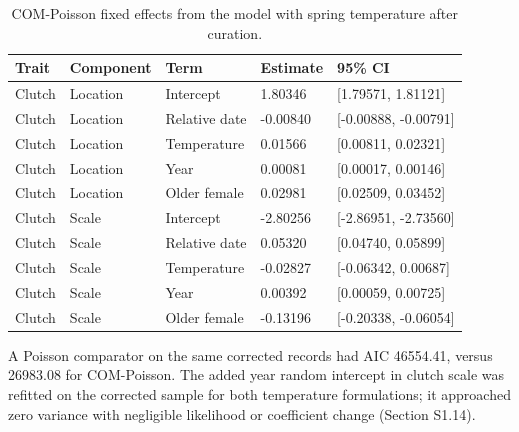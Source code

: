 \documentclass{article}
\begin{document}
\begin{table}[!ht]\centering\scriptsize\singlespacing
\caption{COM-Poisson fixed effects from the model with spring temperature after curation.}\label{tab:count-coefficients}
\begin{tabular}{lllll}\toprule
Trait & Component & Term & Estimate & 95\% CI\\\midrule
Clutch & Location & Intercept & 1.80346 & [1.79571, 1.81121]\\
Clutch & Location & Relative date & -0.00840 & [-0.00888, -0.00791]\\
Clutch & Location & Temperature & 0.01566 & [0.00811, 0.02321]\\
Clutch & Location & Year & 0.00081 & [0.00017, 0.00146]\\
Clutch & Location & Older female & 0.02981 & [0.02509, 0.03452]\\
Clutch & Scale & Intercept & -2.80256 & [-2.86951, -2.73560]\\
Clutch & Scale & Relative date & 0.05320 & [0.04740, 0.05899]\\
Clutch & Scale & Temperature & -0.02827 & [-0.06342, 0.00687]\\
Clutch & Scale & Year & 0.00392 & [0.00059, 0.00725]\\
Clutch & Scale & Older female & -0.13196 & [-0.20338, -0.06054]\\
\bottomrule\end{tabular}\end{table}
A Poisson comparator on the same corrected records had AIC 46554.41, versus 26983.08 for COM-Poisson. The added year random intercept in clutch scale was refitted on the corrected sample for both temperature formulations; it approached zero variance with negligible likelihood or coefficient change (Section S1.14).
\end{document}
